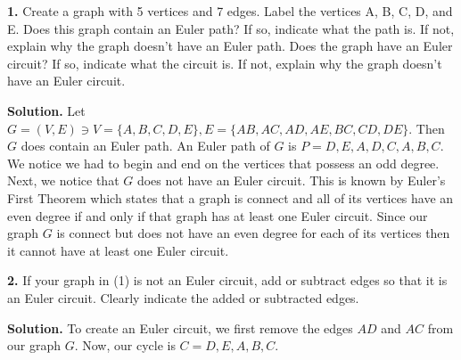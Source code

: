 \documentclass{article}
\begin{document}
\setlength{\parindent}{0cm}   %



\textbf{1.} Create a graph with 5 vertices and 7 edges. Label the vertices A, B, C, D, and E. Does this graph contain an Euler path? If so, indicate what the path is. If not, explain why the graph doesn't have an
Euler path. Does the graph have an Euler circuit? If so, indicate what the circuit is. If not, explain
why the graph doesn't have an Euler circuit.
\vspace{3mm}

\textbf{Solution.} Let \( G = (V,E) \ni V=\{ A,B,C,D,E\}, E=\{AB,AC,AD,AE,BC,CD,DE\} \). Then \(G\) does contain an Euler path. An Euler path of \(G\) is \(P = D,E,A,D,C,A,B,C \). We notice we had to begin and end on the vertices that possess an odd degree. Next, we notice that \(G\) does not have an Euler circuit. This is known by Euler's First Theorem which states that a graph is connect and all of its vertices have an even degree if and only if that graph has at least one Euler circuit. Since our graph \(G\) is connect but does not have an even degree for each of its vertices then it cannot have at least one Euler circuit. 



\vspace{1mm}
\begin{center}
\end{center}

\textbf{2.} If your graph in (1) is not an Euler circuit, add or subtract edges so that it is an Euler circuit. Clearly indicate the added or subtracted edges.

\vspace{2mm}
\textbf{Solution.} To create an Euler circuit, we first remove the edges \(AD \) and \(AC\) from our graph \(G\). Now, our cycle is \(C= D,E,A,B,C\). 

\begin{center}
\end{center}
\end{document}
